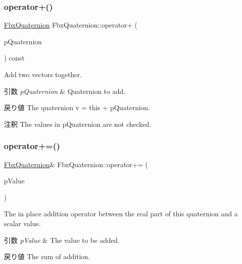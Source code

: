 \subsubsection{\texorpdfstring{operator+()}{operator+()}\hspace{0.1cm}{\footnotesize\ttfamily [2/2]}}
{\footnotesize\ttfamily \hyperlink{class_fbx_quaternion}{Fbx\+Quaternion} Fbx\+Quaternion\+::operator+ (\begin{DoxyParamCaption}\item[{const \hyperlink{class_fbx_quaternion}{Fbx\+Quaternion} \&}]{p\+Quaternion }\end{DoxyParamCaption}) const}

Add two vectors together. 
\begin{DoxyParams}{引数}
{\em p\+Quaternion} & Quaternion to add. \\
\hline
\end{DoxyParams}
\begin{DoxyReturn}{戻り値}
The quaternion v\textquotesingle{} = this + p\+Quaternion. 
\end{DoxyReturn}
\begin{DoxyRemark}{注釈}
The values in p\+Quaternion are not checked. 
\end{DoxyRemark}
\mbox{\label{class_fbx_quaternion_a445a2cf1c72fe2015d1d4b9bbf0cd4a9}} 
\subsubsection{\texorpdfstring{operator+=()}{operator+=()}\hspace{0.1cm}{\footnotesize\ttfamily [1/2]}}
{\footnotesize\ttfamily \hyperlink{class_fbx_quaternion}{Fbx\+Quaternion}\& Fbx\+Quaternion\+::operator+= (\begin{DoxyParamCaption}\item[{double}]{p\+Value }\end{DoxyParamCaption})}

The in place addition operator between the real part of this quaternion and a scalar value. 
\begin{DoxyParams}{引数}
{\em p\+Value} & The value to be added. \\
\hline
\end{DoxyParams}
\begin{DoxyReturn}{戻り値}
The sum of addition. 
\end{DoxyReturn}
\mbox{\label{class_fbx_quaternion_a1bf1954c2f12e9dd4f4403b117263bd6}} 
